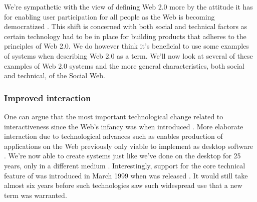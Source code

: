 We're sympathetic with the view of defining
Web 2.0 more by the attitude it has for enabling user participation for all
people \citep[]{lin07} as the Web is becoming democratized
\citep{graham05}. This shift is concerned with both social and
technical factors as certain technology had to be in place for building
products that adheres to the principles of Web 2.0. We do however think it's
beneficial to use some examples of systems when describing Web 2.0 as a term.
We'll now look at several of these examples of Web 2.0 systems and
the more general characteristics, both social and technical,
of the Social Web.

\subsubsection{Improved interaction}
One can argue that the most important
technological change related to interactiveness since the Web's infancy was
when \citet{garrett05} introduced .%
More elaborate interaction due to technological advances such as 
enables production of applications on the Web previously only viable to
implement as desktop software .
We're now able to create systems just like we've done on the desktop for 25
years, only in a different medium \citep[]{arnowitz07}.
Interestingly, support for the core technical feature of  was
introduced in March 1999 when 
was released \citep{microsoft99}. It would still take almost six years before
such technologies saw such widespread use that a new term was warranted.

